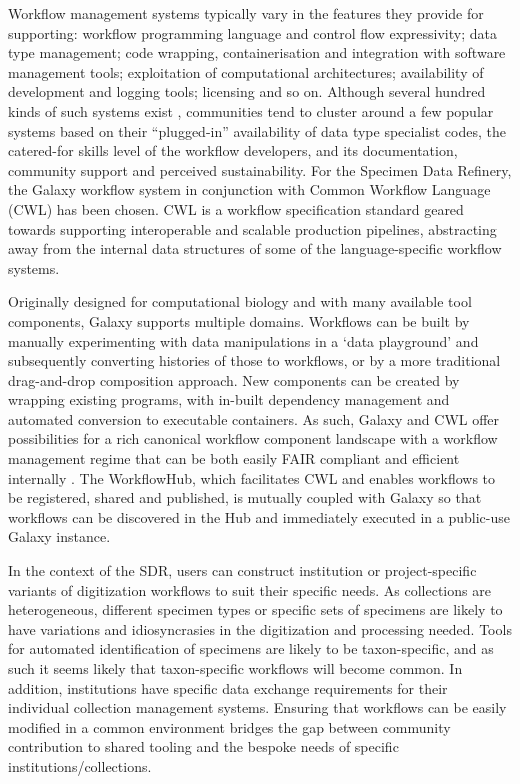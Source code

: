 Workflow management systems typically vary in the features they provide
for supporting: workflow programming language and control flow
expressivity; data type management; code wrapping, containerisation and
integration with software management tools; exploitation of
computational architectures; availability of development and logging
tools; licensing and so on. Although several hundred kinds of such
systems exist \cite{ch8-43}, communities tend to cluster around a few popular
systems based on their ``plugged-in'' availability of data type
specialist codes, the catered-for skills level of the workflow
developers, and its documentation, community support and perceived
sustainability. For the Specimen Data Refinery, the Galaxy workflow
system \cite{Afgan 2018} in conjunction with Common Workflow Language (CWL)
\cite{Crusoe 2022} has been chosen. CWL is a workflow specification standard
geared towards supporting interoperable and scalable production
pipelines, abstracting away from the internal data structures of some of
the language-specific workflow systems.

Originally designed for computational biology and with many available
tool components, Galaxy \cite{Afgan 2018} supports multiple domains. Workflows
can be built by manually experimenting with data manipulations in a
`data playground' and subsequently converting histories of those to
workflows, or by a more traditional drag-and-drop composition approach.
New components can be created by wrapping existing programs, with
in-built dependency management and automated conversion to executable
containers. As such, Galaxy and CWL offer possibilities for a rich
canonical workflow component landscape with a workflow management regime
that can be both easily FAIR compliant and efficient internally
\cite{ch8-27}. The WorkflowHub, which facilitates CWL and enables workflows
to be registered, shared and published, is mutually coupled with Galaxy
so that workflows can be discovered in the Hub and immediately executed
in a public-use Galaxy instance.

In the context of the SDR, users can construct institution or
project-specific variants of digitization workflows to suit their
specific needs. As collections are heterogeneous, different specimen
types or specific sets of specimens are likely to have variations and
idiosyncrasies in the digitization and processing needed. Tools for
automated identification of specimens are likely to be taxon-specific,
and as such it seems likely that taxon-specific workflows will become
common. In addition, institutions have specific data exchange
requirements for their individual collection management systems.
Ensuring that workflows can be easily modified in a common environment
bridges the gap between community contribution to shared tooling and the
bespoke needs of specific institutions/collections.

